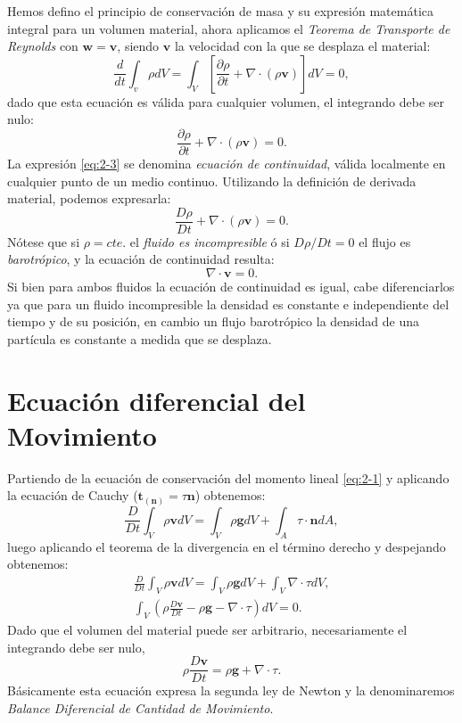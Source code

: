 \documentclass[a4paper,10pt, oneside]{book}
\begin{document}
Hemos defino el principio de conservación de masa y su expresión matemática integral para un volumen material, ahora aplicamos el \textit{Teorema de Transporte de Reynolds} con $\mathbf{w} = \mathbf{v}$, siendo 
$\mathbf{v}$ la velocidad con la que se desplaza el material:
\begin{equation}
	\frac{d}{dt} \int_v \rho dV = \int_V \left[ \frac{\partial \rho}{\partial t} + \nabla \cdot (\rho \mathbf{v}) \right] dV = 0, \nonumber
\end{equation}
dado que esta ecuación es válida para cualquier volumen, el integrando debe ser nulo:
\begin{equation}
	\frac{\partial \rho}{\partial t} + \nabla \cdot (\rho \mathbf{v}) = 0.
	\label{eq:2-3}
\end{equation}
La expresión \ref{eq:2-3} se denomina \textit{ecuación de continuidad}, válida localmente en cualquier punto de un medio continuo. Utilizando la definición de derivada material, podemos expresarla:
\begin{equation}
	\frac{D \rho}{D t} + \nabla \cdot (\rho \mathbf{v}) = 0. \nonumber
\end{equation}
Nótese que si $\rho = cte.$ el \textit{fluido es incompresible} ó si $D \rho / Dt = 0$ el flujo es \textit{barotrópico}, y la ecuación de continuidad resulta:
\begin{equation}
	\nabla \cdot \mathbf{v} = 0.
	\label{eq:2-4}
\end{equation}
Si bien para ambos fluidos la ecuación de continuidad es igual, cabe diferenciarlos ya que para un fluido incompresible la densidad es constante e independiente del tiempo y de su posición, en cambio un flujo barotrópico la densidad de una partícula es constante a medida que se desplaza.

\section{Ecuación diferencial del Movimiento}

Partiendo de la ecuación de conservación del momento lineal \ref{eq:2-1} y aplicando la ecuación de Cauchy ($\mathbf{t_{(n)}} = \tau \mathbf{n}$) obtenemos:
\begin{equation}
	\frac{D}{Dt} \int_V \rho \mathbf{v} dV = \int_V \rho \mathbf{g} dV + \int_A \tau \cdot \mathbf{n} dA, \nonumber
\end{equation}
luego aplicando el teorema de la divergencia en el término derecho y despejando obtenemos:
\begin{eqnarray}
	\frac{D}{Dt} \int_V \rho \mathbf{v} dV = \int_V \rho \mathbf{g} dV + \int_V \nabla \cdot \tau dV, \nonumber \\
	\int_V \left( \rho \frac{D \mathbf{v}}{Dt} - \rho \mathbf{g} - \nabla \cdot \tau  \right) dV = 0. \nonumber
\end{eqnarray}
Dado que el volumen del material puede ser arbitrario, necesariamente el integrando debe ser nulo,
\begin{equation}
	\rho \frac{D \mathbf{v}}{Dt} = \rho \mathbf{g} + \nabla \cdot \tau.
	\label{eq:2-5}
\end{equation}
Básicamente esta ecuación expresa la segunda ley de Newton y la denominaremos \textit{Balance Diferencial de Cantidad de Movimiento}.
\end{document}
